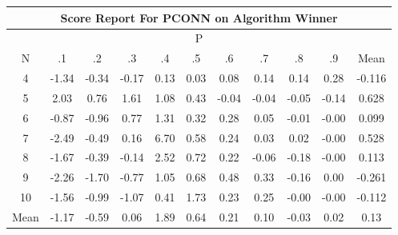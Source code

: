 \documentclass[11pt,a4paper]{report}
\begin{document}
\begin{longtable}{ | c || c | c | c | c | c | c | c | c | c || c |}
\hline
\multicolumn{11}{|c|}{ Score Report For PCONN on Algorithm Winner} \\
\hline
\multicolumn{11}{|c|}{ P } \\
\hline
N & .1 & .2 & .3 & .4 & .5 & .6 & .7 & .8 & .9 & Mean\\
 \hline
 \hline
 \endhead
  4 &  \cellcolor[HTML]{FFDFDF} -1.34 &  \cellcolor[HTML]{FFF7F7} -0.34 &  \cellcolor[HTML]{FFF7F7} -0.17 &  \cellcolor[HTML]{FFFFFF} 0.13 &  \cellcolor[HTML]{FFFFFF} 0.03 &  \cellcolor[HTML]{FFFFFF} 0.08 &  \cellcolor[HTML]{FFFFFF} 0.14 &  \cellcolor[HTML]{FFFFFF} 0.14 &  \cellcolor[HTML]{F7F7FF} 0.28 & -0.116 \\
  5 &  \cellcolor[HTML]{CFCFFF} 2.03 &  \cellcolor[HTML]{EFEFFF} 0.76 &  \cellcolor[HTML]{D7D7FF} 1.61 &  \cellcolor[HTML]{E7E7FF} 1.08 &  \cellcolor[HTML]{F7F7FF} 0.43 &  \cellcolor[HTML]{FFFFFF} -0.04 &  \cellcolor[HTML]{FFFFFF} -0.04 &  \cellcolor[HTML]{FFFFFF} -0.05 &  \cellcolor[HTML]{FFFFFF} -0.14 & 0.628 \\
  6 &  \cellcolor[HTML]{FFE7E7} -0.87 &  \cellcolor[HTML]{FFE7E7} -0.96 &  \cellcolor[HTML]{EFEFFF} 0.77 &  \cellcolor[HTML]{DFDFFF} 1.31 &  \cellcolor[HTML]{F7F7FF} 0.32 &  \cellcolor[HTML]{F7F7FF} 0.28 &  \cellcolor[HTML]{FFFFFF} 0.05 &  \cellcolor[HTML]{FFFFFF} -0.01 &  \cellcolor[HTML]{FFFFFF} -0.00 & 0.099 \\
  7 &  \cellcolor[HTML]{FFBFBF} -2.49 &  \cellcolor[HTML]{FFEFEF} -0.49 &  \cellcolor[HTML]{F7F7FF} 0.16 &  \cellcolor[HTML]{5858FF} 6.70 &  \cellcolor[HTML]{EFEFFF} 0.58 &  \cellcolor[HTML]{F7F7FF} 0.24 &  \cellcolor[HTML]{FFFFFF} 0.03 &  \cellcolor[HTML]{FFFFFF} 0.02 &  \cellcolor[HTML]{FFFFFF} -0.00 & 0.528 \\
  8 &  \cellcolor[HTML]{FFD7D7} -1.67 &  \cellcolor[HTML]{FFF7F7} -0.39 &  \cellcolor[HTML]{FFFFFF} -0.14 &  \cellcolor[HTML]{BFBFFF} 2.52 &  \cellcolor[HTML]{EFEFFF} 0.72 &  \cellcolor[HTML]{F7F7FF} 0.22 &  \cellcolor[HTML]{FFFFFF} -0.06 &  \cellcolor[HTML]{FFF7F7} -0.18 &  \cellcolor[HTML]{FFFFFF} -0.00 & 0.113 \\
  9 &  \cellcolor[HTML]{FFC7C7} -2.26 &  \cellcolor[HTML]{FFD7D7} -1.70 &  \cellcolor[HTML]{FFEFEF} -0.77 &  \cellcolor[HTML]{E7E7FF} 1.05 &  \cellcolor[HTML]{EFEFFF} 0.68 &  \cellcolor[HTML]{EFEFFF} 0.48 &  \cellcolor[HTML]{F7F7FF} 0.33 &  \cellcolor[HTML]{FFFFFF} -0.16 &  \cellcolor[HTML]{FFFFFF} 0.00 & -0.261 \\
  10 &  \cellcolor[HTML]{FFD7D7} -1.56 &  \cellcolor[HTML]{FFE7E7} -0.99 &  \cellcolor[HTML]{FFE7E7} -1.07 &  \cellcolor[HTML]{F7F7FF} 0.41 &  \cellcolor[HTML]{D7D7FF} 1.73 &  \cellcolor[HTML]{F7F7FF} 0.23 &  \cellcolor[HTML]{F7F7FF} 0.25 &  \cellcolor[HTML]{FFFFFF} -0.00 &  \cellcolor[HTML]{FFFFFF} -0.00 & -0.112 \\
 \hline
 \hline
Mean &  \cellcolor[HTML]{FFDFDF} -1.17 &  \cellcolor[HTML]{FFEFEF} -0.59 &  \cellcolor[HTML]{FFFFFF} 0.06 &  \cellcolor[HTML]{CFCFFF} 1.89 &  \cellcolor[HTML]{EFEFFF} 0.64 &  \cellcolor[HTML]{F7F7FF} 0.21 &  \cellcolor[HTML]{FFFFFF} 0.10 &  \cellcolor[HTML]{FFFFFF} -0.03 &  \cellcolor[HTML]{FFFFFF} 0.02 &  \cellcolor[HTML]{FFFFFF} 0.13
\end{longtable}
\end{document}

